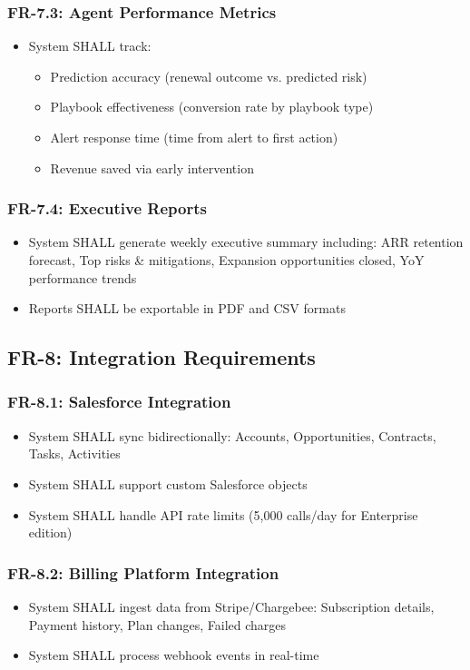 \documentclass[12pt,a4paper]{article}
\begin{document}
\subsubsection{FR-7.3: Agent Performance Metrics}
\begin{itemize}
    \item System SHALL track:
    \begin{itemize}
        \item Prediction accuracy (renewal outcome vs. predicted risk)
        \item Playbook effectiveness (conversion rate by playbook type)
        \item Alert response time (time from alert to first action)
        \item Revenue saved via early intervention
    \end{itemize}
\end{itemize}
\subsubsection{FR-7.4: Executive Reports}
\begin{itemize}
    \item System SHALL generate weekly executive summary including: ARR retention forecast, Top risks \& mitigations, Expansion opportunities closed, YoY performance trends
    \item Reports SHALL be exportable in PDF and CSV formats
\end{itemize}

\subsection{FR-8: Integration Requirements}
\subsubsection{FR-8.1: Salesforce Integration}
\begin{itemize}
    \item System SHALL sync bidirectionally: Accounts, Opportunities, Contracts, Tasks, Activities
    \item System SHALL support custom Salesforce objects
    \item System SHALL handle API rate limits (5,000 calls/day for Enterprise edition)
\end{itemize}
\subsubsection{FR-8.2: Billing Platform Integration}
\begin{itemize}
    \item System SHALL ingest data from Stripe/Chargebee: Subscription details, Payment history, Plan changes, Failed charges
    \item System SHALL process webhook events in real-time
\end{itemize}
\end{document}
